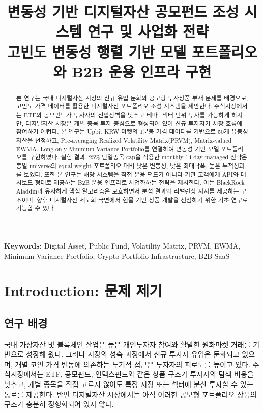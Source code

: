 \documentclass[12pt,a4paper]{article}
\title{\textbf{변동성 기반 디지털자산 공모펀드 조성 시스템 연구 및 사업화 전략}\\[0.5em]\large 고빈도 변동성 행렬 기반 모델 포트폴리오와 B2B 운용 인프라 구현}
\author{}
\date{}
\begin{document}
\maketitle

\begin{abstract}
본 연구는 국내 디지털자산 시장의 신규 유입 둔화와 공모형 투자상품 부재 문제를 배경으로, 고빈도 가격 데이터를 활용한 디지털자산 포트폴리오 조성 시스템을 제안한다. 주식시장에서는 ETF와 공모펀드가 투자자의 진입장벽을 낮추고 테마·섹터 단위 투자를 가능하게 하지만, 디지털자산 시장은 개별 종목 투자 중심으로 형성되어 있어 신규 투자자가 시장 흐름에 참여하기 어렵다. 본 연구는 Upbit KRW 마켓의 1분봉 가격 데이터를 기반으로 50개 유동성 자산을 선정하고, Pre-averaging Realized Volatility Matrix(PRVM), Matrix-valued EWMA, Long-only Minimum Variance Portfolio를 연결하여 변동성 기반 모델 포트폴리오를 구현하였다. 실험 결과, 25\% 단일종목 cap을 적용한 monthly 14-day managed 전략은 동일 universe의 equal-weight 포트폴리오 대비 낮은 변동성, 낮은 최대낙폭, 높은 누적성과를 보였다. 또한 본 연구는 해당 시스템을 직접 운용 펀드가 아니라 기관 고객에게 API와 대시보드 형태로 제공하는 B2B 운용 인프라로 사업화하는 전략을 제시한다. 이는 BlackRock Aladdin과 유사하게 핵심 알고리즘은 보호하면서 분석 결과와 리밸런싱 지시를 제공하는 구조이며, 향후 디지털자산 제도화 국면에서 현물 기반 상품 개발을 선점하기 위한 기초 연구로 기능할 수 있다.
\end{abstract}
\noindent\textbf{Keywords:} Digital Asset, Public Fund, Volatility Matrix, PRVM, EWMA, Minimum Variance Portfolio, Crypto Portfolio Infrastructure, B2B SaaS

\section{Introduction: 문제 제기}

\subsection{연구 배경}

국내 가상자산 및 블록체인 산업은 높은 개인투자자 참여와 활발한 원화마켓 거래를 기반으로 성장해 왔다. 그러나 시장의 성숙 과정에서 신규 투자자 유입은 둔화되고 있으며, 개별 코인 가격 변동에 의존하는 투기적 접근은 투자자의 피로도를 높이고 있다. 주식시장에서는 ETF, 공모펀드, 인덱스펀드와 같은 상품 구조가 투자자의 탐색 비용을 낮추고, 개별 종목을 직접 고르지 않아도 특정 시장 또는 섹터에 분산 투자할 수 있는 통로를 제공한다. 반면 디지털자산 시장에서는 아직 이러한 공모형 포트폴리오 상품의 구조가 충분히 정형화되어 있지 않다.
\end{document}
